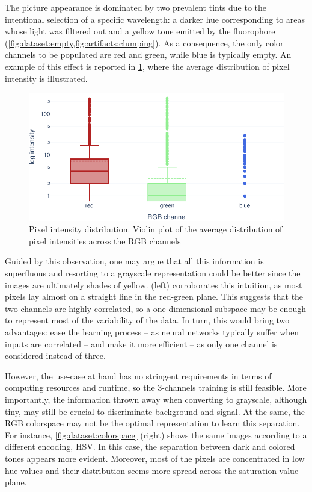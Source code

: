 The picture appearance is dominated by two prevalent tints due to the intentional selection of a specific wavelength: a darker hue corresponding to areas whose light was filtered out and a yellow tone emitted by the fluorophore
(\cref{fig:dataset:empty,fig:artifacts:clumping}).
As a consequence, the only color channels to be populated are red and green, while blue is typically empty. 
An example of this effect is reported in \cref{fig:dataset:pixel_intensity}, where the average distribution of pixel intensity is illustrated.
\begin{figure}
    \centering
    \includegraphics[width=\textwidth]{figures/120_dataset/features/pixel_intensity_distribution.pdf}
    \caption{Pixel intensity distribution. Violin plot of the average distribution of pixel intensities across the  RGB channels}
    \label{fig:dataset:pixel_intensity}
\end{figure}
Guided by this observation, one may argue that all this information is superfluous and resorting to a grayscale representation could be better since the images are ultimately shades of yellow.
 (left) corroborates this intuition, as most pixels lay almost on a straight line in the red-green plane. 
This suggests that the two channels are highly correlated, so a one-dimensional subspace may be enough to represent most of the variability of the data.
In turn, this would bring two advantages: ease the learning process -- as neural networks typically suffer when inputs are correlated %
-- and make it more efficient -- as only one channel is considered instead of three.

However, the use-case at hand has no stringent requirements in terms of computing resources and runtime, so the 3-channels training is still feasible.
More importantly, the information thrown away when converting to grayscale, although tiny, may still be crucial to discriminate background and signal. 
At the same, the RGB colorspace may not be the optimal representation to learn this separation. For instance, \cref{fig:dataset:colorspace} (right) shows the same images according to a different encoding, HSV. 
In this case, the separation between dark and colored tones appears more evident. 
Moreover, most of the pixels are concentrated in low hue values
and their distribution seems more spread across the saturation-value plane. 


